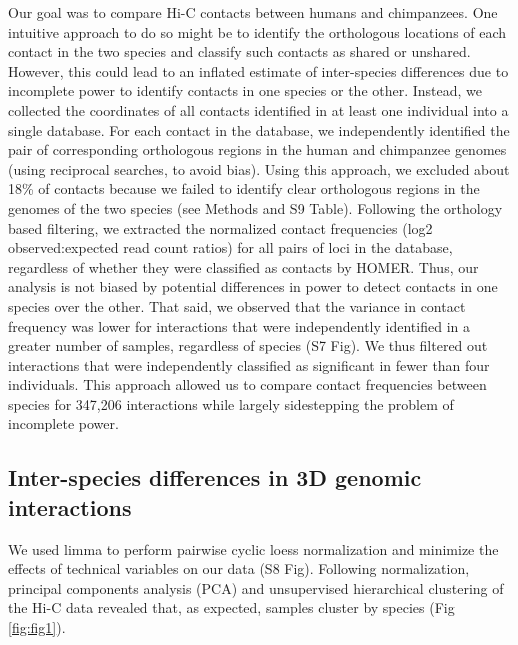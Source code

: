 Our goal was to compare Hi-C contacts between humans and chimpanzees. One intuitive approach to do so might be to identify the orthologous locations of each contact in the two species and classify such contacts as shared or unshared. However, this could lead to an inflated estimate of inter-species differences due to incomplete power to identify contacts in one species or the other. Instead, we collected the coordinates of all contacts identified in at least one individual into a single database. For each contact in the database, we independently identified the pair of corresponding orthologous regions in the human and chimpanzee genomes (using reciprocal searches, to avoid bias). Using this approach, we excluded about 18\% of contacts because we failed to identify clear orthologous regions in the genomes of the two species (see Methods and S9 Table). Following the orthology based filtering, we extracted the normalized contact frequencies (log2 observed:expected read count ratios) for all pairs of loci in the database, regardless of whether they were classified as contacts by HOMER. Thus, our analysis is not biased by potential differences in power to detect contacts in one species over the other. That said, we observed that the variance in contact frequency was lower for interactions that were independently identified in a greater number of samples, regardless of species (S7 Fig). We thus filtered out interactions that were independently classified as significant in fewer than four individuals. This approach allowed us to compare contact frequencies between species for 347,206 interactions while largely sidestepping the problem of incomplete power.

\subsection{Inter-species differences in 3D genomic interactions}
We used limma \cite{Smyth.2004} to perform pairwise cyclic loess normalization and minimize the effects of technical variables on our data (S8 Fig). Following normalization, principal components analysis (PCA) and unsupervised hierarchical clustering of the Hi-C data revealed that, as expected, samples cluster by species (Fig \ref{fig:fig1}).

